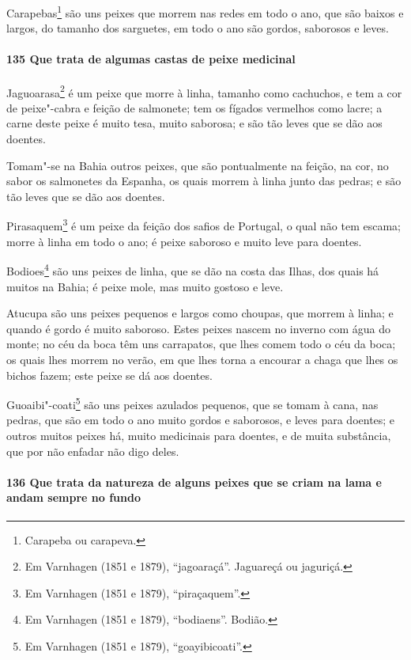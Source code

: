 Carapebas\footnote{ Carapeba ou carapeva.} são uns peixes que morrem nas redes em todo o
ano, que são baixos e largos, do tamanho dos sarguetes, em todo o ano são gordos,
saborosos e leves.

\paragraph{135 Que trata de algumas castas de peixe medicinal}

Jaguoarasa\footnote{ Em Varnhagen (1851 e 1879), ``jagoaraçá''. Jaguareçá ou jaguriçá.} é
um peixe que morre à linha, tamanho como cachuchos, e tem a cor de peixe"-cabra e feição de
salmonete; tem os fígados vermelhos como lacre; a carne deste peixe é muito tesa, muito
saborosa; e são tão leves que se dão aos doentes.

Tomam"-se na Bahia outros peixes, que são pontualmente na feição, na cor, no sabor os
salmonetes da Espanha, os quais morrem à linha junto das pedras; e são tão leves que se
dão aos doentes.

Pirasaquem\footnote{ Em Varnhagen (1851 e 1879), ``piraçaquem''.} é um peixe da feição dos
safios de Portugal, o qual não tem escama; morre à linha em todo o ano; é peixe saboroso e
muito leve para doentes.

Bodioes\footnote{ Em Varnhagen (1851 e 1879), ``bodiaens''. Bodião.} são uns peixes de
linha, que se dão na costa das Ilhas, dos quais há muitos na Bahia; é peixe mole, mas
muito gostoso e leve.

Atucupa são uns peixes pequenos e largos como choupas, que morrem à linha; e quando é
gordo é muito saboroso. Estes peixes nascem no inverno com água do monte; no céu da boca
têm uns carrapatos, que lhes comem todo o céu da boca; os quais lhes morrem no verão, em
que lhes torna a encourar a chaga que lhes os bichos fazem; este peixe se dá aos doentes.

Guoaibi"-coati\footnote{ Em Varnhagen (1851 e 1879), ``goayibicoati''.} são uns peixes
azulados pequenos, que se tomam à cana, nas pedras, que são em todo o ano muito gordos e
saborosos, e leves para doentes; e outros muitos peixes há, muito medicinais para doentes,
e de muita substância, que por não enfadar não digo deles.

\paragraph{136 Que trata da natureza de alguns peixes que se criam na lama e andam sempre
no fundo}

